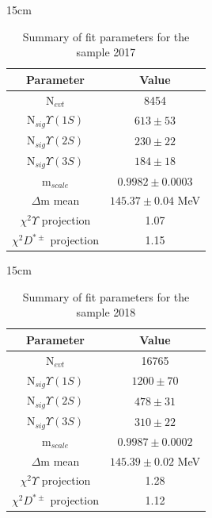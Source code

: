 \begin{table}[!htbp]{15cm}
  \caption{Summary of fit parameters for the sample 2017}\label{tab:fit_summary_2017}
  \begin{tabular}{ c | c }
    Parameter                    & Value                 \\
    \hline
    N$_{evt}$                    & 8454                  \\ \hline
    N$_{sig} \Upsilon(1S)$       & $613 \pm 53$          \\ \hline
    N$_{sig} \Upsilon(2S)$       & $230 \pm 22$          \\ \hline
    N$_{sig} \Upsilon(3S)$       & $184 \pm 18$          \\ \hline
    m$_{scale}$                  & $0.9982 \pm 0.0003$   \\ \hline
    $\Delta$m mean               & $145.37 \pm 0.04$ MeV \\ \hline
    $\chi^2 \Upsilon$ projection & 1.07                  \\ \hline
    $\chi^2 D^{*\pm}$ projection & 1.15                  \\ \hline
  \end{tabular}
\end{table}

\begin{table}[!htbp]{15cm}
  \caption{Summary of fit parameters for the sample 2018}\label{tab:fit_summary_2018}
  \begin{tabular}{ c | c }
    Parameter                    & Value                 \\
    \hline
    N$_{evt}$                    & 16765                 \\ \hline
    N$_{sig} \Upsilon(1S)$       & $1200 \pm 70$         \\ \hline
    N$_{sig} \Upsilon(2S)$       & $478 \pm 31$          \\ \hline
    N$_{sig} \Upsilon(3S)$       & $310 \pm 22$          \\ \hline
    m$_{scale}$                  & $0.9987 \pm 0.0002$   \\ \hline
    $\Delta$m mean               & $145.39 \pm 0.02$ MeV \\ \hline
    $\chi^2 \Upsilon$ projection & 1.28                  \\ \hline
    $\chi^2 D^{*\pm}$ projection & 1.12                  \\ \hline
  \end{tabular}
\end{table}

